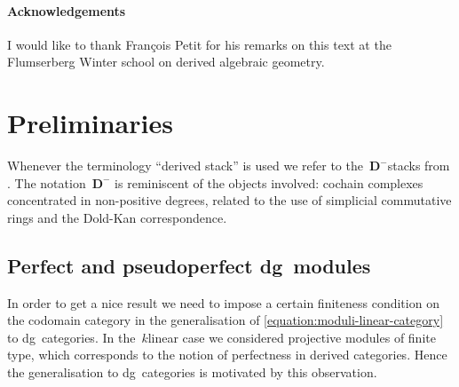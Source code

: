 \begin{refsection}
\paragraph{Acknowledgements}
I would like to thank Fran\c{c}ois Petit for his remarks on this text at the Flumserberg Winter school on derived algebraic geometry.


\section{Preliminaries}
\label{section:preliminaries}
Whenever the terminology ``derived stack'' is used we refer to the~$\mathbf{D}^-$\dash stacks from \cite{toen-vezzosi-hag-II}. The notation~$\mathbf{D}^-$ is reminiscent of the objects involved: cochain complexes concentrated in non-positive degrees, related to the use of simplicial commutative rings and the Dold-Kan correspondence.

\subsection{Perfect and pseudoperfect dg~modules}
In order to get a nice result we need to impose a certain finiteness condition on the codomain category in the generalisation of \eqref{equation:moduli-linear-category} to dg~categories. In the~$k$\dash linear case we considered projective modules of finite type, which corresponds to the notion of perfectness in derived categories. Hence the generalisation to dg~categories is motivated by this observation.


\end{refsection}
